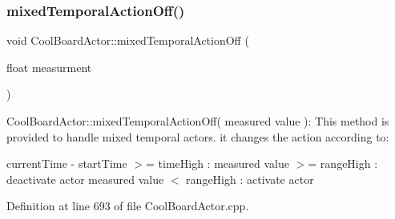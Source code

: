 \subsubsection{\texorpdfstring{mixed\+Temporal\+Action\+Off()}{mixedTemporalActionOff()}}
{\footnotesize\ttfamily void Cool\+Board\+Actor\+::mixed\+Temporal\+Action\+Off (\begin{DoxyParamCaption}\item[{float}]{measurment }\end{DoxyParamCaption})}

Cool\+Board\+Actor\+::mixed\+Temporal\+Action\+Off( measured value )\+: This method is provided to handle mixed temporal actors. it changes the action according to\+:

current\+Time -\/ start\+Time $>$= time\+High \+: measured value $>$= range\+High \+: deactivate actor measured value $<$ range\+High \+: activate actor 

Definition at line 693 of file Cool\+Board\+Actor.\+cpp.


